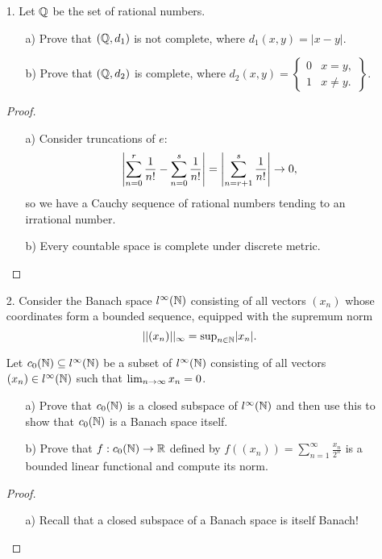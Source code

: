 

\begin{itemize}
\item[1.] Let $\mathbb{Q}$ be the set of rational numbers. 
\begin{itemize}
    \item[a)] Prove that $(\mathbb{Q}, d_1)$ is not complete, where $d_1(x,y) = |x-y|$. 
    
    \item[b)] Prove that $(\mathbb{Q}, d_2)$ is complete, where $d_2(x,y) = \begin{Bmatrix}
0 & x=y, \\
1 & x \neq y.
\end{Bmatrix}$.
\end{itemize}
 
\begin{proof}
\begin{itemize}
    \item[a)] Consider truncations of $e$: \[\left|\sum_{n=0}^r \frac{1}{n!} - \sum_{n=0}^s \frac{1}{n!}\right| = \left| \sum_{n=r+1}^{s} \frac{1}{n!} \right| \rightarrow 0,\]
    so we have a Cauchy sequence of rational numbers tending to an irrational number. 
    \item[b)] Every countable space is complete under discrete metric.
\end{itemize}\end{proof}




\item[2.] Consider the Banach space $l^\infty(\mathbb{N})$ consisting of all vectors $(x_n)$ whose coordinates form a bounded sequence, equipped with the supremum norm 
\[||(x_n)||_\infty = \text{sup}_{n\in\mathbb{N}} |x_n|.\]

Let $c_0(\mathbb{N}) \subseteq l^\infty(\mathbb{N})$ be a subset of $l^\infty(\mathbb{N})$ consisting of all vectors $(x_n) \in l^\infty(\mathbb{N})$ such that $\lim_{n\rightarrow\infty} x_n = 0$.
\begin{itemize}
    \item[a)] Prove that $c_0(\mathbb{N})$ is a closed subspace of $l^\infty(\mathbb{N})$ and then use this to show that $c_0(\mathbb{N})$ is a Banach space itself.
    
    \item[b)] Prove that $f:c_0(\mathbb{N}) \rightarrow \mathbb{R}$ defined by $f((x_n)) = \sum_{n=1}^\infty \frac{x_n}{2^n}$ is a bounded linear functional and compute its norm.
\end{itemize}
 
\begin{proof}
\begin{itemize}
    \item[a)] Recall that a closed subspace of a Banach space is itself Banach! 


\end{itemize}
\end{proof}
\end{itemize}
